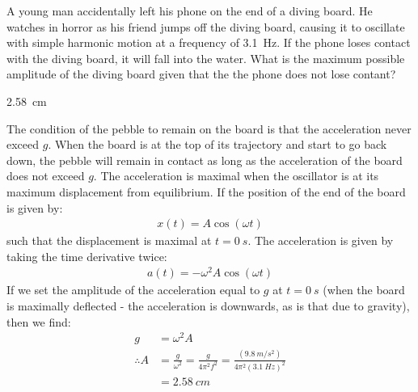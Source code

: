 \question A young man accidentally left his phone on the end of a diving board. He watches in horror as his friend jumps off the diving board, causing it to oscillate with simple harmonic motion at a frequency of \SI{3.1}{Hz}. If the phone loses contact with the diving board, it will fall into the water. What is the maximum possible amplitude of the diving board given that the the phone does not lose contant?
\begin{finalanswer}
\SI{2.58}{cm}
\end{finalanswer}
\begin{solution}
The condition of the pebble to remain on the board is that the acceleration never exceed $g$. When the board is at the top of its trajectory and start to go back down, the pebble will remain in contact as long as the acceleration of the board does not exceed $g$. The acceleration is maximal when the oscillator is at its maximum displacement from equilibrium. If the position of the end of the board is given by:
\begin{align*}
x(t)=A\cos(\omega t)
\end{align*}
such that the displacement is maximal at $t=\SI{0}{s}$. The acceleration is given by taking the time derivative twice:
\begin{align*}
a(t) = -\omega^2A\cos(\omega t)
\end{align*}
If we set the amplitude of the acceleration equal to $g$ at $t=\SI{0}{s}$ (when the board is maximally deflected - the acceleration is downwards, as is that due to gravity), then we find:
\begin{align*}
g &= \omega^2A\\
\therefore A&=\frac{g}{\omega^2}=\frac{g}{4\pi^2 f^2}=\frac{(\SI{9.8}{m/s^2})}{4\pi^2 (\SI{3.1}{Hz})^2}\\
&=\SI{2.58}{cm}
\end{align*} 
\end{solution}

